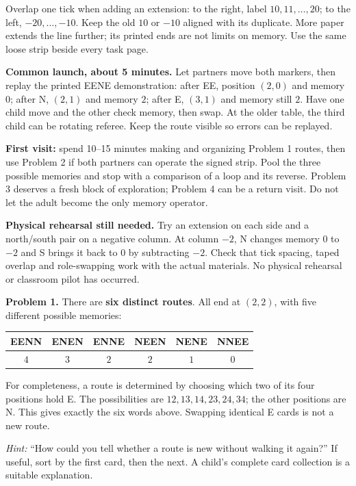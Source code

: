 \documentclass[11pt,letterpaper]{article}
\newcommand{\sectiontitle}[1]{\par\vspace{4pt}{\large\bfseries #1}\par}
\newcommand{\answer}[1]{\par\vspace{3pt}\textbf{Problem #1.} }
\begin{document}
Overlap one tick when adding an extension: to the right, label $10,11,\ldots,20$; to the left, $-20,\ldots,-10$. Keep the old $10$ or $-10$ aligned with its duplicate. More paper extends the line further; its printed ends are not limits on memory. Use the same loose strip beside every task page.

\textbf{Common launch, about 5 minutes.} Let partners move both markers, then replay the printed EENE demonstration: after EE, position $(2,0)$ and memory $0$; after N, $(2,1)$ and memory $2$; after E, $(3,1)$ and memory still $2$. Have one child move and the other check memory, then swap. At the older table, the third child can be rotating referee. Keep the route visible so errors can be replayed.
\newpage
\sectiontitle{A manageable route and the first answers}
\textbf{First visit:} spend 10--15 minutes making and organizing Problem 1 routes, then use Problem 2 if both partners can operate the signed strip. Pool the three possible memories and stop with a comparison of a loop and its reverse. Problem 3 deserves a fresh block of exploration; Problem 4 can be a return visit. Do not let the adult become the only memory operator.

\textbf{Physical rehearsal still needed.} Try an extension on each side and a north/south pair on a negative column. At column $-2$, N changes memory $0$ to $-2$ and S brings it back to $0$ by subtracting $-2$. Check that tick spacing, taped overlap and role-swapping work with the actual materials. No physical rehearsal or classroom pilot has occurred.

\answer{1} There are \textbf{six distinct routes}. All end at $(2,2)$, with five different possible memories:
\begin{center}\renewcommand{\arraystretch}{1.2}
\begin{tabular}{@{}cccccc@{}}
EENN & ENEN & ENNE & NEEN & NENE & NNEE\\\hline
$4$ & $3$ & $2$ & $2$ & $1$ & $0$
\end{tabular}\end{center}
For completeness, a route is determined by choosing which two of its four positions hold E. The possibilities are $12,13,14,23,24,34$; the other positions are N. This gives exactly the six words above. Swapping identical E cards is not a new route.

\textit{Hint:} ``How could you tell whether a route is new without walking it again?'' If useful, sort by the first card, then the next. A child's complete card collection is a suitable explanation.
\end{document}
